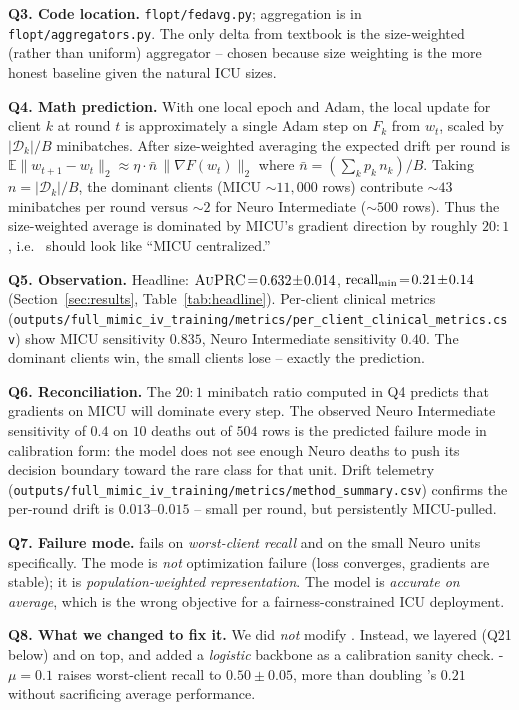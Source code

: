 \textbf{Q3. Code location.} \texttt{flopt/fedavg.py}; aggregation is in
\texttt{flopt/aggregators.py}. The only delta from textbook \fedavg{}
is the size-weighted (rather than uniform) aggregator -- chosen because
size weighting is the more honest baseline given the natural ICU sizes.

\textbf{Q4. Math prediction.}
With one local epoch and Adam, the local update for client $k$ at round
$t$ is approximately a single Adam step on $F_k$ from $w_t$, scaled by
$|\mathcal{D}_k|/B$ minibatches. After size-weighted averaging the
expected drift per round is
$\mathbb{E}\| w_{t+1} \!-\! w_t \|_2 \approx \eta \cdot
\bar{n}\,\|\nabla F(w_t)\|_2$ where $\bar{n} = (\sum_k p_k\,n_k)/B$.
Taking $n \!=\! |\mathcal{D}_k|/B$, the dominant clients (MICU
$\sim$$11{,}000$ rows) contribute $\sim$$43$ minibatches per round
versus $\sim$$2$ for Neuro Intermediate ($\sim$$500$ rows). Thus the
size-weighted average is dominated by MICU's gradient direction by
roughly $20{:}1$, i.e.\ \fedavg{} should look like ``MICU centralized.''

\textbf{Q5. Observation.}
Headline: $\textsc{AuPRC}{} \!=\! 0.632 \!\pm\! 0.014$,
$\text{recall}_{\min}{} \!=\! 0.21 \!\pm\! 0.14$ (Section~\ref{sec:results},
Table~\ref{tab:headline}). Per-client clinical metrics
(\texttt{outputs/full\_mimic\_iv\_training/metrics/per\_client\_clinical\_metrics.csv})
show MICU sensitivity $0.835$, Neuro Intermediate sensitivity $0.40$.
The dominant clients win, the small clients lose -- exactly the
prediction.

\textbf{Q6. Reconciliation.}
The $20{:}1$ minibatch ratio computed in Q4 predicts that gradients on
MICU will dominate every step. The observed Neuro Intermediate
sensitivity of $0.4$ on $10$ deaths out of $504$ rows is the predicted
failure mode in calibration form: the model does not see enough Neuro
deaths to push its decision boundary toward the rare class for that
unit. Drift telemetry
(\texttt{outputs/full\_mimic\_iv\_training/metrics/method\_summary.csv})
confirms the per-round drift is $0.013$--$0.015$ -- small per round,
but persistently MICU-pulled.

\textbf{Q7. Failure mode.}
\fedavg{} fails on \emph{worst-client recall} and on the small Neuro
units specifically. The mode is \emph{not} optimization failure (loss
converges, gradients are stable); it is \emph{population-weighted
representation}. The model is \emph{accurate on average}, which is the
wrong objective for a fairness-constrained ICU deployment.

\textbf{Q8. What we changed to fix it.}
We did \emph{not} modify \fedavg{}. Instead, we layered \fedprox{} (Q21
below) and \cvar{} on top, and added a \emph{logistic} backbone as a
calibration sanity check. \fedprox{}-$\mu\!=\!0.1$ raises worst-client
recall to $0.50 \!\pm\! 0.05$, more than doubling \fedavg{}'s $0.21$
without sacrificing average performance.

